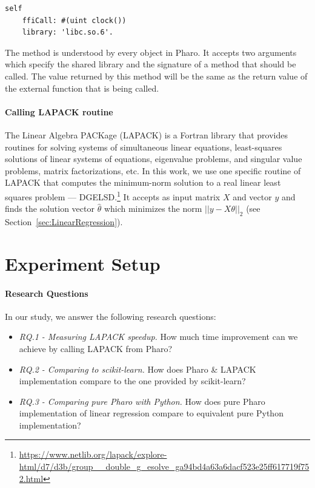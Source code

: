 \documentclass[]{ceurart}
\begin{document}
\begin{lstlisting}[language=Smalltalk]
self
    ffiCall: #(uint clock())
    library: 'libc.so.6'.
\end{lstlisting}

The method  is understood by every object in Pharo.
It accepts two arguments which specify the shared library and the signature of a method that should be called.
The value returned by this method will be the same as the return value of the external function that is being called.

\paragraph{Calling LAPACK routine}

The Linear Algebra PACKage (LAPACK) is a Fortran library that provides routines for solving systems of simultaneous linear equations, least-squares solutions of linear systems of equations, eigenvalue problems, and singular value problems, matrix factorizations, etc.
In this work, we use one specific routine of LAPACK that computes the minimum-norm solution to a real linear least squares problem --- DGELSD.\footnote{\url{https://www.netlib.org/lapack/explore-html/d7/d3b/group__double_g_esolve_ga94bd4a63a6dacf523e25ff617719f752.html}}
It accepts as input matrix $X$ and vector $y$ and finds the solution vector $\hat \theta$ which minimizes the norm $||y - X\theta||_2$ (see Section~\ref{sec:LinearRegression}).



\section{Experiment Setup}
\label{sec:ExperimentSetup}

\paragraph{Research Questions} In our study, we answer the following research questions:

\begin{itemize}
\item \emph{RQ.1 - Measuring LAPACK speedup.} How much time improvement can we achieve by calling LAPACK from Pharo?
\item \emph{RQ.2 - Comparing to scikit-learn.} How does Pharo \& LAPACK implementation compare to the one provided by scikit-learn?
\item \emph{RQ.3 - Comparing pure Pharo with Python.} How does pure Pharo implementation of linear regression compare to equivalent pure Python implementation?
\end{itemize}
\end{document}
